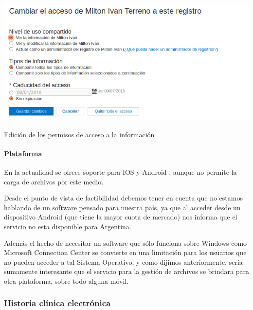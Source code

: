 \begin{itemize}
{    \begin{correccionFigure}[h]
      \centering
      \includegraphics[width=.8\textwidth]{img/tp1/3-cambiar_permisos}
      \caption{Edición de los permisos de acceso a la información}
      \label{cambiar_permisos}
    \end{correccionFigure} 
}  
\clearpage
\paragraph{Plataforma}



En la actualidad se ofrece soporte para IOS y Android , aunque no permite la carga de archivos por este medio.

	Desde el punto de vista de factibilidad debemos tener en cuenta que no estamos hablando de un software pensado para nuestra país, ya que al acceder desde un dispositivo Android (que tiene la mayor cuota de mercado)  nos informa que el servicio no esta disponible para Argentina. 
	
	Además el hecho de necesitar un software que sólo funciona sobre Windows como Microsoft Connection Center se convierte en una limitación para los usuarios que no pueden acceder a tal Sistema Operativo, y como dijimos anteriormente, sería sumamente interesante que el servicio para la gestión de archivos se brindara para otra plataforma, sobre todo alguna móvil.
\end{itemize}



\clearpage
\subsubsection{Historia clínica electrónica}

